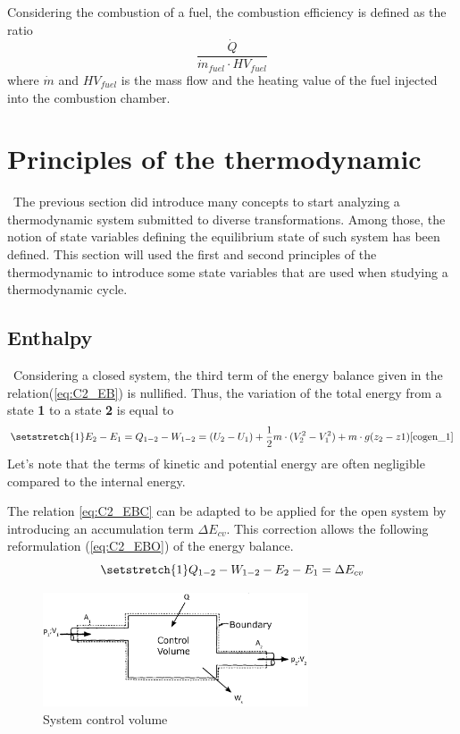 Considering the combustion of a fuel, the combustion efficiency is defined as the ratio
$$ \frac{\dot{Q}}{\dot{m}_{fuel}\cdot HV_{fuel}}$$
where $\dot{m}$  and $HV_{fuel}$ is the mass flow and the heating value of the fuel injected into the combustion chamber.
\section{Principles of the thermodynamic}
\quad\, The previous section did introduce many concepts to start analyzing a thermodynamic system submitted to diverse transformations. Among those, the notion of state variables defining the equilibrium state of such system has been defined. This section will used the first and second principles of the thermodynamic to introduce some state variables that are used when studying a thermodynamic cycle.

\subsection{Enthalpy}
\quad\, Considering a closed system, the third term of the energy balance given in the relation(\ref{eq:C2_EB}) is nullified. Thus, the variation of the total energy from a state \textbf{1} to a state \textbf{2} is equal to
\begin{equation}
\setstretch{1}
E_{2} - E_{1} = Q_{1-2} - W_{1-2} = (U_2 - U_1) + \frac{1}{2}m\cdot(V^2_2 - V^2_1) + m\cdot g(z_2 - z1)\cite{cogen_1} \label{eq:C2_EBC}
\end{equation}
Let's note that the terms of kinetic and potential energy are often negligible compared to the internal energy.  

The relation \ref{eq:C2_EBC} can be adapted to be applied for the open system by introducing an accumulation term $\Delta E_{cv}$. This correction allows the following reformulation (\ref{eq:C2_EBO}) of the energy balance.
\begin{equation}
\setstretch{1}
Q_{1-2} - W_{1-2} - E_{2} - E_{1} = \Delta E_{cv}\label{eq:C2_EBO}
\end{equation}

\begin{figure}[h]
\centering
\includegraphics[width=0.7\textwidth]{control_volume.png}
\caption{System control volume \cite{Dewallef2019}}
\label{fig:C2_VC}
\end{figure}

